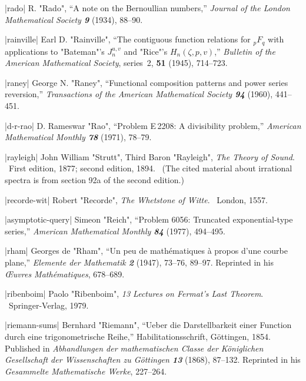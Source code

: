 

\bib|rado|%
R. "Rado", ``A note on the Bernoullian numbers,''
{\sl Journal of the London Mathematical Society\/ \bf9} (1934), 88--90.

\bib|rainville|%
Earl D. "Rainville", ``The contiguous function relations for $_pF_q$ with
applications to "Bateman"'s $J_n^{u,v}$ and "Rice"'s $H_n(\zeta,p,v)$,''
{\sl Bulletin of the American Mathematical Society}, series~2,
{\bf51} (1945), 714--723.

\bib|raney|%
George N. "Raney", ``Functional composition patterns and power series
reversion,'' {\sl Transactions of the American Mathematical Society\/ \bf94}
(1960), 441--451.

\bib|d-r-rao|%
D. Rameswar "Rao", ``Problem E\,2208: A divisibility problem,''
{\sl American Mathematical Monthly\/ \bf78} (1971), 78--79.

\bib|rayleigh|%
John William "Strutt", Third Baron "Rayleigh", {\sl The Theory of Sound}. \
First edition, 1877; second edition, 1894. \ (The cited material about
irrational spectra is from section 92a of the second edition.)

\bib|recorde-wit|%
Robert "Recorde", {\sl The Whetstone of Witte}. \
London, 1557.

\bib|asymptotic-query|%
Simeon "Reich", ``Problem 6056: Truncated exponential-type series,''
{\sl American Mathematical Monthly\/ \bf84} (1977), 494--495.

\bib|rham|%
Georges de "Rham", ``Un peu de math\'ematiques \`a propos d'une courbe plane,''
{\sl Elemente der Mathematik\/ \bf2} (1947), 73--76, 89--97.
Reprinted in his {\sl \OE uvres Math\'ematiques}, 678--689.

\bib|ribenboim|%
Paolo "Ribenboim", {\sl 13 Lectures on Fermat's Last Theorem}. \
Springer-Verlag, 1979.

\bib|riemann-sums|%
Bernhard "Riemann", ``Ueber die Darstellbarkeit einer Function durch eine
trigonometrische Reihe,'' Habilitations\-schrift, G\"ottingen, 1854.
Published in {\sl Abhandlungen der mathematischen Classe der
K\"oniglichen Gesellschaft der Wissenschaften zu G\"ottingen\/ \bf13}
(1868), 87--132. Reprinted in his {\sl Gesammelte Mathematische Werke},
227--264.

